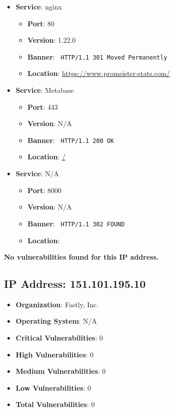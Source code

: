 \documentclass{article}
\begin{document}
\begin{itemize}
    
        \item \textbf{Service}: nginx
        \begin{itemize}
            \item \textbf{Port}: 80
            \item \textbf{Version}:  1.22.0 
            \item \textbf{Banner}: \texttt{ HTTP/1.1 301 Moved Permanently
 }
            \item \textbf{Location}: \href{ https://www.promeister-stats.com/ }{ https://www.promeister-stats.com/ }
        \end{itemize}
    
        \item \textbf{Service}: Metabase
        \begin{itemize}
            \item \textbf{Port}: 443
            \item \textbf{Version}:  N/A 
            \item \textbf{Banner}: \texttt{ HTTP/1.1 200 OK
 }
            \item \textbf{Location}: \href{ / }{ / }
        \end{itemize}
    
        \item \textbf{Service}: N/A
        \begin{itemize}
            \item \textbf{Port}: 8000
            \item \textbf{Version}:  N/A 
            \item \textbf{Banner}: \texttt{ HTTP/1.1 302 FOUND
 }
            \item \textbf{Location}: \href{  }{  }
        \end{itemize}
    
\end{itemize}


\textbf{No vulnerabilities found for this IP address.}


\clearpage



\subsection*{IP Address: 151.101.195.10}

\begin{itemize}
    \item \textbf{Organization}: Fastly, Inc.
    \item \textbf{Operating System}:  N/A 
    \item \textbf{Critical Vulnerabilities}: 0
    \item \textbf{High Vulnerabilities}: 0
    \item \textbf{Medium Vulnerabilities}: 0
    \item \textbf{Low Vulnerabilities}: 0
    \item \textbf{Total Vulnerabilities}: 0
\end{itemize}
\end{document}
